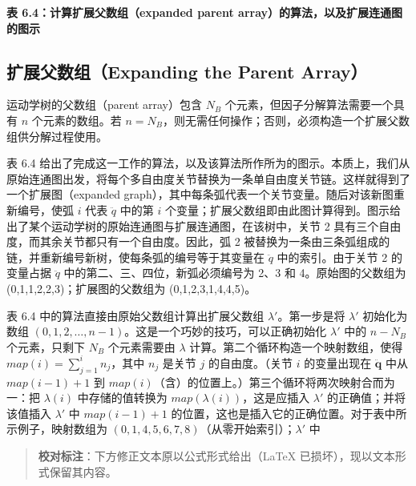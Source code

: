 \documentclass[10pt,a4paper]{book}
\theoremstyle{thmstyle} %
\theoremstyle{defstyle} %
\theoremstyle{prostyle} %
\begin{document}
\noindent\textbf{表 6.4：计算扩展父数组（expanded parent array）的算法，以及扩展连通图的图示}





\subsection{扩展父数组（Expanding the Parent Array）}





运动学树的父数组（parent array）包含 $N_B$ 个元素，但因子分解算法需要一个具有 $n$ 个元素的数组。若 $n = N_B$，则无需任何操作；否则，必须构造一个扩展父数组供分解过程使用。



表 6.4 给出了完成这一工作的算法，以及该算法所作所为的图示。本质上，我们从原始连通图出发，将每个多自由度关节替换为一条单自由度关节链。这样就得到了一个扩展图（expanded graph），其中每条弧代表一个关节变量。随后对该新图重新编号，使弧 $i$ 代表 $\ddot{q}$ 中的第 $i$ 个变量；扩展父数组即由此图计算得到。图示给出了某个运动学树的原始连通图与扩展连通图，在该树中，关节 2 具有三个自由度，而其余关节都只有一个自由度。因此，弧 2 被替换为一条由三条弧组成的链，并重新编号新树，使每条弧的编号等于其变量在 $\ddot{q}$ 中的索引。由于关节 2 的变量占据 $\ddot{q}$ 中的第二、三、四位，新弧必须编号为 2、3 和 4。原始图的父数组为 (0,1,1,2,2,3)；扩展图的父数组为 (0,1,2,3,1,4,4,5)。



表 6.4 中的算法直接由原始父数组计算出扩展父数组 $\lambda'$。第一步是将 $\lambda'$ 初始化为数组 $(0,1,2,\ldots,n-1)$。这是一个巧妙的技巧，可以正确初始化 $\lambda'$ 中的 $n-N_B$ 个元素，只剩下 $N_B$ 个元素需要由 $\lambda$ 计算。第二个循环构造一个映射数组，使得 $map(i)=\sum_{j=1}^{i}n_j$，其中 $n_j$ 是关节 $j$ 的自由度。（关节 $i$ 的变量出现在 $\ddot{\mathbf{q}}$ 中从 $map(i-1)+1$ 到 $map(i)$（含）的位置上。）第三个循环将两次映射合而为一：把 $\lambda(i)$ 中存储的值转换为 $map(\lambda(i))$，这是应插入 $\lambda'$ 的正确值；并将该值插入 $\lambda'$ 中 $map(i-1)+1$ 的位置，这也是插入它的正确位置。对于表中所示例子，映射数组为 $(0,1,4,5,6,7,8)$（从零开始索引）；$\lambda'$ 中



\begin{quote}

\textbf{校对标注}：下方修正文本原以公式形式给出（LaTeX 已损坏），现以文本形式保留其内容。

\end{quote}
\end{document}
